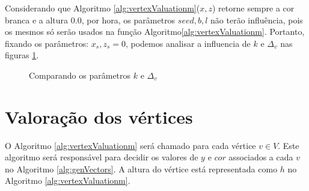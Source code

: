 Considerando que Algoritmo \ref{alg:vertexValuationm}($x, z$) retorne sempre a cor branca
e a altura $0.0$, por hora, os parâmetros $seed, b, l$ não terão influência, pois os mesmos 
só serão usados na função Algoritmo\ref{alg:vertexValuationm}. Portanto, fixando os parâmetros: $x_{s}, z_{s} = 0$, 
podemos analisar a influencia de $k$ e $\Delta_{v}$ nas figuras \ref{fig:parametrosGrid}.

\begin{figure}[H]
     \centering
     \hspace{0.1cm}
     \hspace{0.1cm}
     \caption{Comparando os parâmetros $k$ e $\Delta_{v}$}
     \label{fig:parametrosGrid}
\end{figure}

\section{Valoração dos vértices}

O Algoritmo \ref{alg:vertexValuationm} será chamado para cada vértice $v \in V$. 
Este algoritmo será responsável para decidir os valores de $y$ e $cor$ associados
a cada $v$ no Algoritmo \ref{alg:genVectors}. A altura do vértice está representada
como $h$ no Algoritmo \ref{alg:vertexValuationm}.

